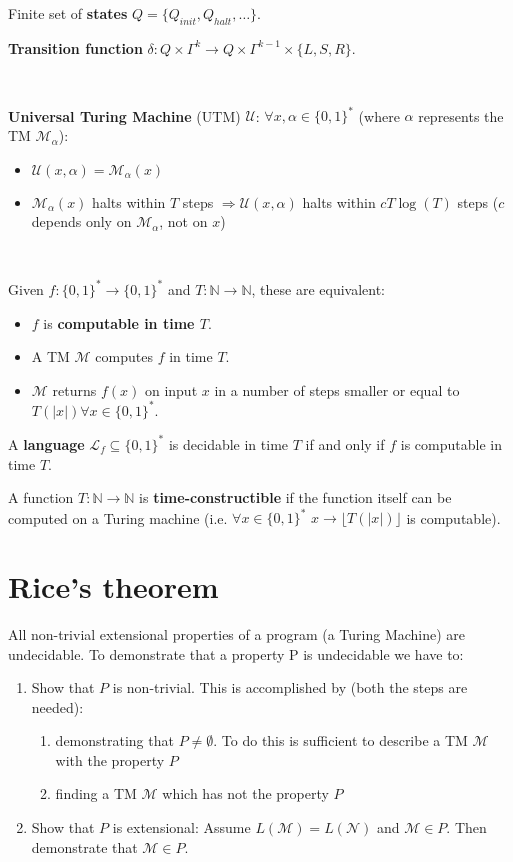 \documentclass[]{article}
\begin{document}
Finite set of \textbf{states} $Q = \{Q_{init},Q_{halt},\dots\}$.

\textbf{Transition function} $\delta: Q \times \Gamma^k \to Q \times \Gamma^{k-1} \times \{L,S,R\}$.

\

\textbf{Universal Turing Machine} (UTM) $\mathcal{U}$: $\forall x, \alpha \in \{0,1\}^*$ (where $\alpha$ represents the TM $\mathcal{M}_{\alpha}$):
\begin{itemize}
	\item $\mathcal{U}(x,\alpha) = \mathcal{M}_{\alpha}(x)$
	\item $\mathcal{M}_{\alpha}(x)$ halts within $T$ steps $\Rightarrow \mathcal{U}(x,\alpha)$ halts within $cT\log(T)$ steps ($c$ depends only on $\mathcal{M}_{\alpha}$, not on $x$)
\end{itemize}

\

Given $f:\{0,1\}^* \to \{0,1\}^*$ and $T:\mathbb{N} \to \mathbb{N}$, these are equivalent:
\begin{itemize}
	\item $f$ is \textbf{computable in time $T$}.
	\item A TM $\mathcal{M}$ computes $f$ in time $T$.
	\item $\mathcal{M}$ returns $f(x)$ on input $x$ in a number of steps smaller or equal to $T(|x|) \forall x \in \{0,1\}^*$.
\end{itemize}

A \textbf{language} $\mathcal{L}_{f} \subseteq\{0,1\}^{*}$ is decidable in time $T$ if and only if $f$ is computable in time $T$.

A function $T:\mathbb{N} \to \mathbb{N}$ is \textbf{time-constructible} if the function itself can be computed on a Turing machine (i.e. $\forall x \in \{0,1\}^*$ $x \to \lfloor T(|x|) \rfloor$ is computable).

\section{Rice's theorem}

All non-trivial extensional properties of a program (a Turing Machine) are undecidable. To demonstrate that a property P is undecidable we have to:
\begin{enumerate}
	\item Show that $P$ is non-trivial. This is accomplished by (both the steps are needed):
	\begin{enumerate}
		\item demonstrating that $P \ne \emptyset$. To do this is sufficient to describe a TM $\mathcal{M}$ with the property $P$
		\item finding a TM $\mathcal{M}$ which has not the property $P$
	\end{enumerate}
\item Show that $P$ is extensional: Assume $L(\mathcal{M}) = L(\mathcal{N})$ and $\mathcal{M} \in P$. Then demonstrate that $\mathcal{M} \in P$.
\end{enumerate}
\end{document}
